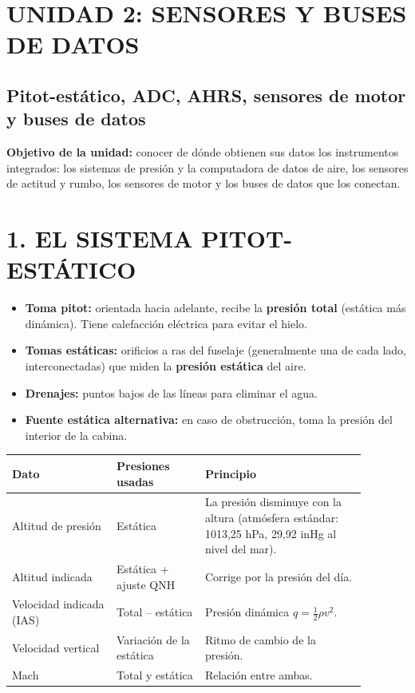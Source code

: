 \clearpage
\section*{UNIDAD 2: SENSORES Y BUSES DE DATOS}
\subsection*{Pitot-estático, ADC, AHRS, sensores de motor y buses de datos}

\begin{recuadro}
\textbf{Objetivo de la unidad:} conocer de dónde obtienen sus datos los instrumentos integrados:
los sistemas de presión y la computadora de datos de aire, los sensores de actitud y rumbo, los
sensores de motor y los buses de datos que los conectan.
\end{recuadro}

\section*{1. EL SISTEMA PITOT-ESTÁTICO}

\begin{itemize}
  \item \textbf{Toma pitot:} orientada hacia adelante, recibe la \textbf{presión total} (estática
        más dinámica). Tiene calefacción eléctrica para evitar el hielo.
  \item \textbf{Tomas estáticas:} orificios a ras del fuselaje (generalmente una de cada lado,
        interconectadas) que miden la \textbf{presión estática} del aire.
  \item \textbf{Drenajes:} puntos bajos de las líneas para eliminar el agua.
  \item \textbf{Fuente estática alternativa:} en caso de obstrucción, toma la presión del interior
        de la cabina.
\end{itemize}

\begin{center}
\small
\begin{tabular}{|p{0.26\linewidth}|p{0.22\linewidth}|p{0.40\linewidth}|}
\hline
\textbf{Dato} & \textbf{Presiones usadas} & \textbf{Principio} \\ \hline
Altitud de presión & Estática & La presión disminuye con la altura (atmósfera estándar: 1013,25
hPa, 29,92 inHg al nivel del mar). \\ \hline
Altitud indicada & Estática + ajuste QNH & Corrige por la presión del día. \\ \hline
Velocidad indicada (IAS) & Total -- estática & Presión dinámica $q = \frac{1}{2}\rho v^2$. \\ \hline
Velocidad vertical & Variación de la estática & Ritmo de cambio de la presión. \\ \hline
Mach & Total y estática & Relación entre ambas. \\ \hline
\end{tabular}
\end{center}

